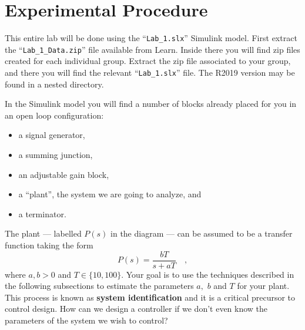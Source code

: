 \section{Experimental Procedure}
This entire lab will be done using the ``\texttt{Lab\_1.slx}'' Simulink model.
First extract the ``\texttt{Lab\_1\_Data.zip}'' file available from Learn.
Inside there you will find zip files created for each individual group. Extract
the zip file associated to your group, and there you will find the relevant
``\texttt{Lab\_1.slx}'' file. The R2019 version may be found in a nested
directory.

In the Simulink model you will
find a number of blocks already placed for you in an open loop configuration:
\begin{itemize}
  \item{a signal generator,}
  \item{a summing junction,}
  \item{an adjustable gain block,}
  \item{a ``plant'', the system we are going to analyze, and}
  \item{a terminator.}
\end{itemize}
%
The plant --- labelled \(P(s)\) in the diagram --- can be assumed to be a
transfer function taking the form
\[
  P(s) = \frac{b T}{s + a T} \quad ,
\]
where \(a, b > 0\) and \(T \in \{10, 100\}.\) Your goal is to use the
techniques described in the following subsections to estimate the parameters
\(a,\) \(b\) and \(T\) for your plant. This process is known as
\textbf{system identification} and it is a critical precursor to control
design. How can we design a controller if we don't even know the parameters
of the system we wish to control?

